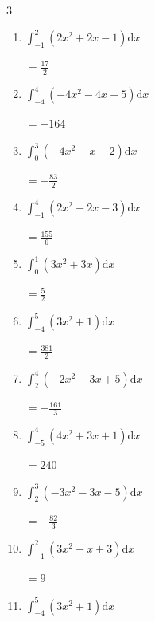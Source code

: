 \begin{multicols}{3}
\begin{enumerate}
        $\displaystyle =-\frac{51}{2}$

  \item $\displaystyle \int_{-1}^{2}\left( 2x^{2}+2x-1 \right) \mathrm{d}x$

        $\displaystyle =\frac{17}{2}$

  \item $\displaystyle \int_{-4}^{4}\left( -4x^{2}-4x+5 \right) \mathrm{d}x$

        $\displaystyle =-164$

\columnbreak %

\resetques

  \item $\displaystyle \int_{0}^{3}\left( -4x^{2}-x-2 \right) \mathrm{d}x$

        $\displaystyle =-\frac{83}{2}$

  \item $\displaystyle \int_{-1}^{4}\left( 2x^{2}-2x-3 \right) \mathrm{d}x$

        $\displaystyle =\frac{155}{6}$

  \item $\displaystyle \int_{0}^{1}\left( 3x^{2}+3x \right) \mathrm{d}x$

        $\displaystyle =\frac{5}{2}$

  \item $\displaystyle \int_{-4}^{5}\left( 3x^{2}+1 \right) \mathrm{d}x$

        $\displaystyle =\frac{381}{2}$

  \item $\displaystyle \int_{2}^{4}\left( -2x^{2}-3x+5 \right) \mathrm{d}x$

        $\displaystyle =-\frac{161}{3}$

\columnbreak %

  \item $\displaystyle \int_{-5}^{4}\left( 4x^{2}+3x+1 \right) \mathrm{d}x$

        $\displaystyle =240$

  \item $\displaystyle \int_{2}^{3}\left( -3x^{2}-3x-5 \right) \mathrm{d}x$

        $\displaystyle =-\frac{82}{3}$

  \item $\displaystyle \int_{-1}^{2}\left( 3x^{2}-x+3 \right) \mathrm{d}x$

        $\displaystyle =9$

  \item $\displaystyle \int_{-4}^{5}\left( 3x^{2}+1 \right) \mathrm{d}x$


\end{enumerate}
\end{multicols}
